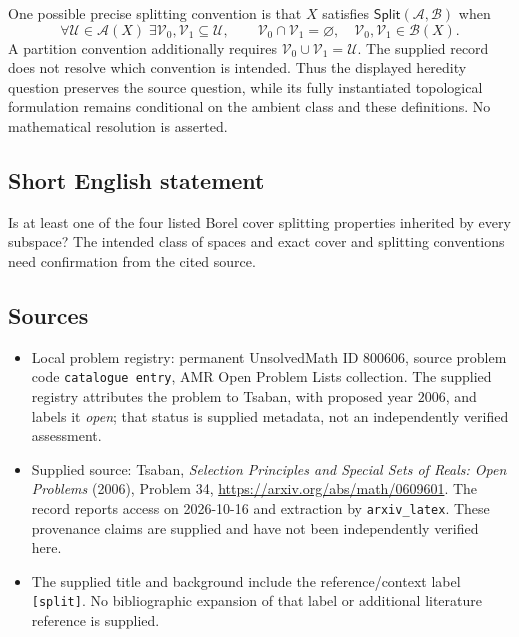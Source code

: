 \documentclass[11pt]{article}
\begin{document}
One possible precise splitting convention is that \(X\) satisfies \(\mathsf{Split}(\mathcal A,\mathcal B)\) when
\[
\forall\mathcal U\in\mathcal A(X)\;\exists\mathcal V_0,\mathcal V_1\subseteq\mathcal U,
\qquad
\mathcal V_0\cap\mathcal V_1=\varnothing,
\quad
\mathcal V_0,\mathcal V_1\in\mathcal B(X).
\]
A partition convention additionally requires \(\mathcal V_0\cup\mathcal V_1=\mathcal U\). The supplied record does not resolve which convention is intended. Thus the displayed heredity question preserves the source question, while its fully instantiated topological formulation remains conditional on the ambient class and these definitions. No mathematical resolution is asserted.
\subsection{Short English statement}
Is at least one of the four listed Borel cover splitting properties inherited by every subspace? The intended class of spaces and exact cover and splitting conventions need confirmation from the cited source.
\subsection{Sources}
\begin{itemize}
\item Local problem registry: permanent UnsolvedMath ID \(800606\), source problem code \texttt{catalogue entry}, AMR Open Problem Lists collection. The supplied registry attributes the problem to Tsaban, with proposed year \(2006\), and labels it \emph{open}; that status is supplied metadata, not an independently verified assessment.
\item Supplied source: Tsaban, \emph{Selection Principles and Special Sets of Reals: Open Problems} (2006), Problem 34, \url{https://arxiv.org/abs/math/0609601}. The record reports access on 2026-10-16 and extraction by \texttt{arxiv\_latex}. These provenance claims are supplied and have not been independently verified here.
\item The supplied title and background include the reference/context label \texttt{[split]}. No bibliographic expansion of that label or additional literature reference is supplied.
\end{itemize}
\end{document}

